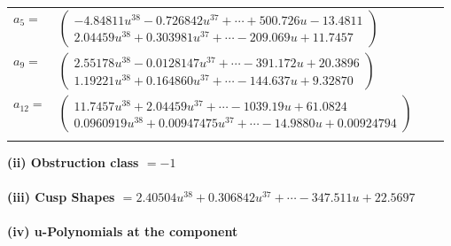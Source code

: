 \documentclass[1p]{elsarticle_modified}
\theoremstyle{definition}
\begin{document}
\begin{tabular}{m{7pt} m{180pt} m{7pt} m{180pt} }
\flushright $a_{5}=$&$\begin{pmatrix}-4.84811 u^{38}-0.726842 u^{37}+\cdots+500.726 u-13.4811\\2.04459 u^{38}+0.303981 u^{37}+\cdots-209.069 u+11.7457\end{pmatrix}$ \\
\flushright $a_{9}=$&$\begin{pmatrix}2.55178 u^{38}-0.0128147 u^{37}+\cdots-391.172 u+20.3896\\1.19221 u^{38}+0.164860 u^{37}+\cdots-144.637 u+9.32870\end{pmatrix}$ \\
\flushright $a_{12}=$&$\begin{pmatrix}11.7457 u^{38}+2.04459 u^{37}+\cdots-1039.19 u+61.0824\\0.0960919 u^{38}+0.00947475 u^{37}+\cdots-14.9880 u+0.00924794\end{pmatrix}$\\&\end{tabular}
\flushleft \textbf{(ii) Obstruction class $= -1$}\\~\\
\flushleft \textbf{(iii) Cusp Shapes $= 2.40504 u^{38}+0.306842 u^{37}+\cdots-347.511 u+22.5697$}\\~\\
\newpage\renewcommand{\arraystretch}{1}
\flushleft \textbf{(iv) u-Polynomials at the component}\newline \\
\end{document}
